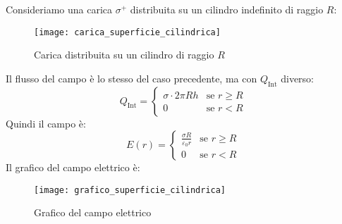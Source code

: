 \documentclass[a4paper]{article}
\begin{document}
\begin{example}
  Consideriamo una carica \( \sigma^+ \) distribuita su un cilindro indefinito di raggio \( R \):
  \begin{figure}[H]
    \centering
    \texttt{[image: carica\_superficie\_cilindrica]}
    \caption{Carica distribuita su un cilindro di raggio \( R \)}
  \end{figure}
  Il flusso del campo è lo stesso del caso precedente, ma con \( Q_{\text{Int}} \) diverso:
  \[
    Q_{\text{Int}} =
    \begin{cases}
      \sigma \cdot 2 \pi R h & \text{se } r \ge R\\
      0 & \text{se } r < R
    \end{cases}
  \] 
  Quindi il campo è:
  \[
    E(r) = \begin{cases}
      \frac{\sigma R}{\varepsilon_0 r} & \text{se } r \ge R\\
      0 & \text{se } r < R
    \end{cases}
  \]
  Il grafico del campo elettrico è:
  \begin{figure}[H]
    \centering
    \texttt{[image: grafico\_superficie\_cilindrica]}
    \caption{Grafico del campo elettrico}
  \end{figure}
\end{example}
\end{document}
